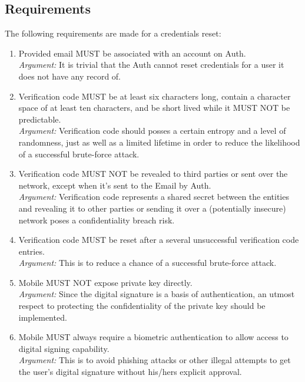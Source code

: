     \subsection{Requirements}
    The following requirements are made for a credentials reset:
    \begin{enumerate}
            \item Provided email MUST be associated with an account on Auth.\\
            \textit{Argument:} It is trivial that the Auth cannot reset credentials for a user it does not have any 
                               record of. 

            \item Verification code MUST be at least six characters long, contain a character space of at least ten 
                  characters, and be short lived while it MUST NOT be predictable.\\        
            \textit{Argument:} Verification code should posses a certain entropy and a level of randomness, 
                               just as well as a limited lifetime in order to reduce the likelihood of a 
                               successful brute-force attack.

            \item Verification code MUST NOT be revealed to third parties or sent over the network, except when
                  it's sent to the Email by Auth.\\        
            \textit{Argument:} Verification code represents a shared secret between the entities and revealing 
                               it to other parties or sending it over a (potentially insecure) network poses 
                               a confidentiality breach risk. 

            \item Verification code MUST be reset after a several unsuccessful verification code entries.\\        
            \textit{Argument:} This is to reduce a chance of a successful brute-force attack.

            \item Mobile MUST NOT expose private key directly.\\
            \textit{Argument:} Since the digital signature is a basis of authentication, an utmost respect to 
                               protecting the confidentiality of the private key should be implemented.

            \item Mobile MUST always require a biometric authentication to allow access to digital signing 
                  capability.\\        
            \textit{Argument:} This is to avoid phishing attacks or other illegal attempts to get the user's 
                               digital signature without his/hers explicit approval.


\end{enumerate}

